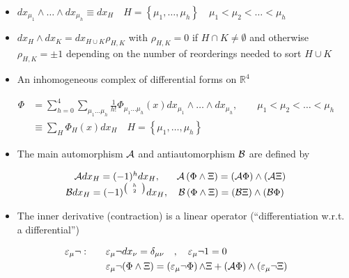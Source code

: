 \begin{itemize}
  \item \(d x_{\mu_{1}} \wedge \ldots \wedge d x_{\mu_{h}} \equiv d x_{H} \quad H=\left\{\mu_{1}, \ldots, \mu_{h}\right\} \quad \mu_{1}<\mu_{2}<\ldots<\mu_{h}\)
  \item $dx_H \wedge dx_K = dx_{H\cup K}\rho_{H,K}$ with $\rho_{H,K} = 0$ if $H \cap K \neq \emptyset$ and otherwise $\rho_{H,K} = \pm1$ depending on the number of reorderings needed to sort $H\cup K$
  \item An inhomogeneous complex of differential forms on $\mathbb{R}^4$
\end{itemize}

\begin{equation}
\begin{aligned}
\Phi & =\sum_{h=0}^{4} \sum_{\mu_{1} \ldots \mu_{h}} \frac{1}{h!} \Phi_{\mu_{1} \ldots \mu_{h}}(x) d x_{\mu_1} \wedge \ldots \wedge d x_{\mu_h},  \qquad \mu_{1}<\mu_{2}<\ldots<\mu_{h}\\
& \equiv \sum_{H} \Phi_{H}(x) d x_{H} \quad H=\left\{\mu_{1}, \ldots, \mu_{h}\right\}
\end{aligned}
\end{equation}

\begin{itemize}
  \item The main automorphism \({\cal A}\) and antiautomorphism \({\cal B}\) are defined by
\end{itemize}

\begin{equation}
\begin{array}{cc}
{\cal A} d x_{H}=(-1)^{h} d x_{H}, & {\cal A}\left(\Phi \wedge \Xi\right)=({\cal A} \Phi) \wedge({\cal A} \Xi) \\
{\cal B} d x_{H}=(-1)^{\left({\tiny \begin{array}{c}h \\2\end{array}}\right)} d x_{H}, & {\cal B}\left(\Phi \wedge \Xi\right)=({\cal B} \Xi) \wedge({\cal B} \Phi)
\end{array}
\end{equation}

\begin{itemize}
  \item The inner derivative (contraction) is a linear operator (``differentiation w.r.t. a differential'')
\end{itemize}

\begin{equation}
\begin{aligned}
\varepsilon_{\mu} \neg: \qquad& \varepsilon_{\mu} \neg d x_{\nu}=\delta_{\mu \nu} \quad, \quad \varepsilon_{\mu} \neg 1=0 \\
& \varepsilon_{\mu} \neg(\Phi \wedge \Xi)=\left(\varepsilon_{\mu} \neg \Phi\right) {\wedge} \Xi+({\cal A} \Phi) \wedge\left(\varepsilon_{\mu} \neg \Xi\right)
\end{aligned}
\end{equation}


